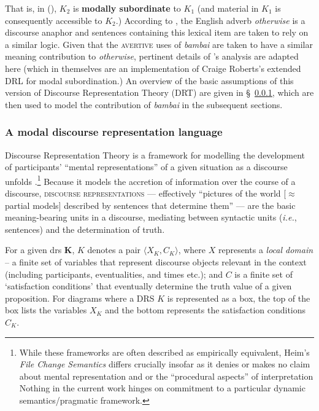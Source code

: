 \noindent That is, in (), $ \mathit{K_2} $ is \textbf{modally subordinate} to $ \mathit{K_1} $ (and material in $ \mathit{K_1} $ is consequently accessible to $ \mathit{K_2} $.) According to \citet{PhilKotek}, the English adverb \textit{otherwise} is a discourse anaphor and sentences containing this lexical item are taken to rely on a similar logic. Given that the \textsc{avertive} uses of \textit{bambai} are taken to have a similar meaning contribution to \textit{otherwise}, pertinent details of \citet{PhilKotek}'s analysis are adapted here (which in themselves are an implementation of Craige Roberts's extended DRL for modal subordination.) An overview of the basic assumptions of this version of Discourse Representation Theory (DRT) are given in \S~\ref{sec-MDRL}, which are then used to model the contribution of \textit{bambai} in the subsequent sections.


\subsubsection{A modal discourse representation language}\label{sec-MDRL}

Discourse Representation Theory \citetext{originating simultaneously with \citealt{Kamp1981} and the related system of \citealt{Heim}} is a framework for modelling the development of participants' ``mental representations'' of a given situation as a discourse unfolds \citep[see][]{Geurts}.\footnote{While these frameworks are often described as empirically equivalent, Heim's \textit{File Change Semantics} differs crucially insofar as it denies or makes no claim about mental representation and or the ``procedural aspects'' of interpretation \citetext{\citealp[102]{Kamp1988}, this property also addressed in \citealp[\S~6]{Geurts}.} Nothing in the current work hinges on commitment to a particular dynamic semantics/pragmatic framework.} 
Because it models the accretion of information over the course of a discourse, \textsc{discourse representations} --- effectively ``pictures of the world [$ \approx $ partial models] described by sentences that determine them'' --- are the basic meaning-bearing units in a discourse, mediating between syntactic units (\textit{i.e.}, sentences) and the determination of truth.


For a given \acrfull{drs} $ \boldsymbol K $, $ K $ denotes a pair $ \langle X_K,C_K\rangle $, where $ X $ represents a \textit{local domain} -- a finite set of variables that represent discourse objects relevant in the context (including participants, eventualities, and times etc.); and $ C $ is a finite set of `satisfaction conditions' that eventually determine the truth value of a given proposition. For diagrams where a DRS $ K $ is represented as a box, the top of the box lists the variables $ X_K $ and the bottom represents the satisfaction conditions $ C_K $. 

